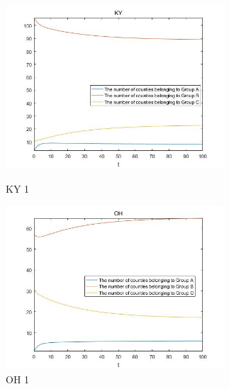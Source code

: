 \documentclass{mcmthesis}
\begin{document}
\begin{figure}[H]
\centering
\begin{minipage}[t]{0.45\textwidth}
\centering
\includegraphics[width=3.2in]{figures/picture/KY_1.jpg}
\caption{KY 1}
\label{KY 1}
\end{minipage}
\hfill
\begin{minipage}[t]{0.45\textwidth}
\centering
\includegraphics[width=3.2in]{figures/picture/OH_1.jpg}
\caption{OH 1}
\label{OH 1}
\end{minipage}
\end{figure}
\end{document}
